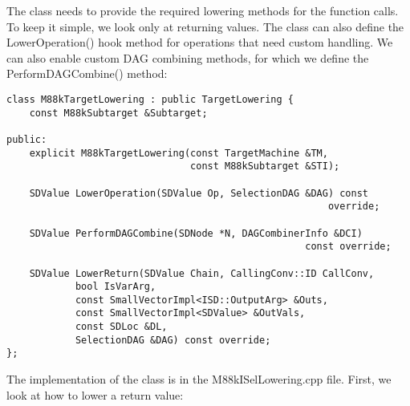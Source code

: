 The class needs to provide the required lowering methods for the function calls. To keep it simple, we look only at returning values. The class can also define the LowerOperation() hook method for operations that need custom handling. We can also enable custom DAG combining methods, for which we define the PerformDAGCombine() method:\par

\begin{lstlisting}[caption={}]
class M88kTargetLowering : public TargetLowering {
	const M88kSubtarget &Subtarget;
	
public:
	explicit M88kTargetLowering(const TargetMachine &TM,
								const M88kSubtarget &STI);
	
	SDValue LowerOperation(SDValue Op, SelectionDAG &DAG) const
														override;
	
	SDValue PerformDAGCombine(SDNode *N, DAGCombinerInfo &DCI)
													const override;
	
	SDValue LowerReturn(SDValue Chain, CallingConv::ID CallConv,
			bool IsVarArg,
			const SmallVectorImpl<ISD::OutputArg> &Outs,
			const SmallVectorImpl<SDValue> &OutVals,
			const SDLoc &DL,
			SelectionDAG &DAG) const override;
};
\end{lstlisting}

The implementation of the class is in the M88kISelLowering.cpp file. First, we look at how to lower a return value:\par

